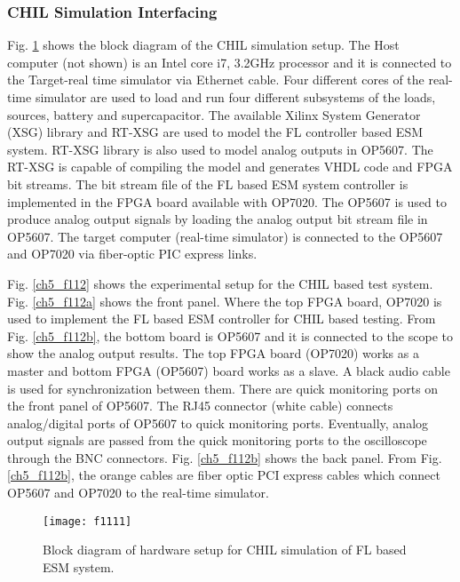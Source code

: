 \subsubsection{CHIL Simulation Interfacing}
Fig. \ref{ch5_f111} shows the block diagram of the CHIL simulation setup. The Host computer (not shown) is an Intel core i7, 3.2GHz processor and it is connected to the Target-real time simulator via Ethernet cable. Four different cores of the real-time simulator are used to load and run four different subsystems of the loads, sources, battery and supercapacitor. The available Xilinx System Generator (XSG) library and RT-XSG are used to model the FL controller based ESM system. RT-XSG library is also used to model analog outputs in OP5607. The RT-XSG is capable of compiling the model and generates VHDL code and FPGA bit streams. The bit stream file of the FL based ESM system controller is implemented in the FPGA board available with OP7020. The OP5607 is used to produce analog output signals by loading the analog output bit stream file in OP5607. The target computer (real-time simulator) is connected to the OP5607 and OP7020 via fiber-optic PIC express links. 


Fig. \ref{ch5_f112} shows the experimental setup for the CHIL based test system. Fig. \ref{ch5_f112a} shows the front panel. Where the top FPGA board, OP7020 is used to implement the FL based ESM controller for CHIL based testing. From Fig. \ref{ch5_f112b}, the bottom board is OP5607 and it is connected to the scope to show the analog output results. The top FPGA board (OP7020) works as a master and bottom FPGA (OP5607) board works as a slave. A black audio cable is used for synchronization between them. There are quick monitoring ports on the front panel of OP5607. The RJ45 connector (white cable) connects analog/digital ports of OP5607 to quick monitoring ports. Eventually, analog output signals are passed from the quick monitoring ports to the oscilloscope through the BNC connectors.  Fig. \ref{ch5_f112b} shows the back panel. From Fig. \ref{ch5_f112b}, the orange cables are fiber optic PCI express cables which connect OP5607 and OP7020 to the real-time simulator. 

\begin{figure}[h!]
\centering

\texttt{[image: f1111]}
\caption{Block diagram of hardware setup for CHIL simulation of FL based ESM system.}
\label{ch5_f111}
\end{figure}

